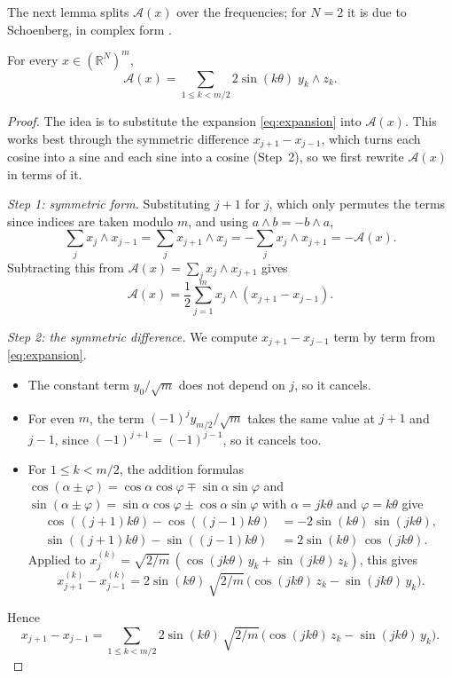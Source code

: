 The next lemma splits $\mathcal{A}(x)$ over the frequencies; for $N = 2$ it
is due to Schoenberg, in complex form \cite[Section~2]{schoenberg-1950}.

\begin{lemma}
  \label{lem:fourier}
  For every $x \in (\mathbb{R}^{N})^{m}$,
  \begin{equation}
    \label{eq:fourier}
    \mathcal{A}(x) = \sum_{1 \leq k < m/2} 2\sin(k\theta)\; y_{k} \wedge z_{k}.
  \end{equation}
\end{lemma}

\begin{proof}
  The idea is to substitute the expansion \eqref{eq:expansion} into
  $\mathcal{A}(x)$. This works best through the symmetric difference
  $x_{j+1} - x_{j-1}$, which turns each cosine into a sine and each sine
  into a cosine (Step~2), so we first rewrite $\mathcal{A}(x)$ in terms of
  it.

  \emph{Step 1: symmetric form.} Substituting $j + 1$ for $j$, which only
  permutes the terms since indices are taken modulo $m$, and using
  $a \wedge b = -b \wedge a$,
  \[
    \sum_{j} x_{j} \wedge x_{j-1} = \sum_{j} x_{j+1} \wedge x_{j}
      = -\sum_{j} x_{j} \wedge x_{j+1} = -\mathcal{A}(x).
  \]
  Subtracting this from $\mathcal{A}(x) = \sum_{j} x_{j} \wedge x_{j+1}$
  gives
  \[
    \mathcal{A}(x) = \frac12 \sum_{j=1}^{m} x_{j} \wedge (x_{j+1} - x_{j-1}).
  \]

  \emph{Step 2: the symmetric difference.} We compute $x_{j+1} - x_{j-1}$
  term by term from \eqref{eq:expansion}.
  \begin{itemize}
    \item The constant term $y_{0}/\sqrt{m}$ does not depend on $j$, so it
      cancels.
    \item For even $m$, the term $(-1)^{j} y_{m/2}/\sqrt{m}$ takes the same
      value at $j + 1$ and $j - 1$, since $(-1)^{j+1} = (-1)^{j-1}$, so it
      cancels too.
    \item For $1 \leq k < m/2$, the addition formulas
      $\cos(\alpha \pm \varphi) = \cos\alpha\cos\varphi \mp
      \sin\alpha\sin\varphi$ and $\sin(\alpha \pm \varphi) =
      \sin\alpha\cos\varphi \pm \cos\alpha\sin\varphi$ with
      $\alpha = jk\theta$ and $\varphi = k\theta$ give
      \[
        \begin{aligned}
          \cos((j+1)k\theta) - \cos((j-1)k\theta)
            &= -2\sin(k\theta)\,\sin(jk\theta), \\
          \sin((j+1)k\theta) - \sin((j-1)k\theta)
            &= 2\sin(k\theta)\,\cos(jk\theta).
        \end{aligned}
      \]
      Applied to $x^{(k)}_{j} = \sqrt{2/m}\,(\cos(jk\theta)\, y_{k} +
      \sin(jk\theta)\, z_{k})$, this gives
      \[
        x^{(k)}_{j+1} - x^{(k)}_{j-1} = 2\sin(k\theta)\, \sqrt{2/m}\,
          \bigl(\cos(jk\theta)\, z_{k} - \sin(jk\theta)\, y_{k}\bigr).
      \]
  \end{itemize}
  Hence
  \[
    x_{j+1} - x_{j-1} = \sum_{1 \leq k < m/2} 2\sin(k\theta)\,
      \sqrt{2/m}\,\bigl(\cos(jk\theta)\, z_{k} - \sin(jk\theta)\, y_{k}\bigr).
  \]


\end{proof}
